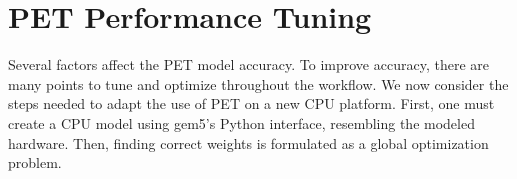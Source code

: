 \chapter{PET Performance Tuning}

Several factors affect the PET model accuracy. To improve accuracy, there are
many points to tune and optimize throughout the workflow. We now consider the
steps needed to adapt the use of PET on a new CPU platform. First, one must
create a CPU model using gem5's Python interface, resembling the modeled
hardware. Then, finding correct weights is formulated as a global optimization
problem.







